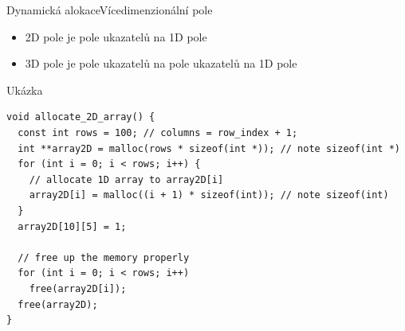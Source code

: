 \begin{frame}[fragile]{Dynamická alokace}{Vícedimenzionální pole}

  \begin{itemize}
    \item 2D pole je pole ukazatelů na 1D pole

    \pause

    \item 3D pole je pole ukazatelů na pole ukazatelů na 1D pole
  \end{itemize}


\begin{block}{Ukázka}
\begin{lstlisting}
void allocate_2D_array() {
  const int rows = 100; // columns = row_index + 1;
  int **array2D = malloc(rows * sizeof(int *)); // note sizeof(int *)
  for (int i = 0; i < rows; i++) {
    // allocate 1D array to array2D[i]
    array2D[i] = malloc((i + 1) * sizeof(int)); // note sizeof(int)
  }
  array2D[10][5] = 1;

  // free up the memory properly
  for (int i = 0; i < rows; i++)
    free(array2D[i]);
  free(array2D);
}
\end{lstlisting}
\end{block}

\end{frame}


